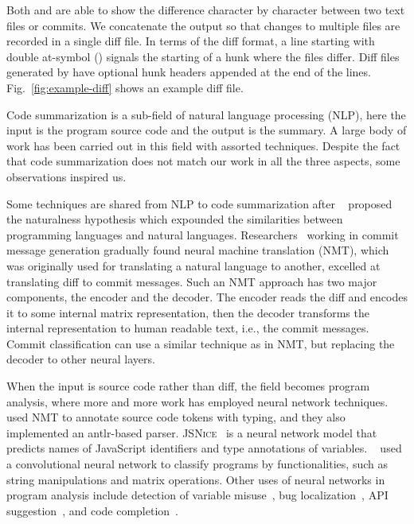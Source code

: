 Both {\gnudiff} and {\gitdiff} are able to show the difference character by character between two text files or commits.
We concatenate the output so that changes to multiple files are recorded in a single diff file.
In terms of the diff format, a line starting with double at-symbol () signals the starting of a hunk where the files differ.
Diff files generated by {\gitdiff} have optional hunk headers appended at the end of the  lines.
Fig.~\ref{fig:example-diff} shows an example diff file.

Code summarization is a sub-field of natural language processing (NLP),
here the input is the program source code and the output is the summary.
A large body of work has been carried out in this field with assorted techniques.
Despite the fact that code summarization does not match our work in all the three aspects,
some observations inspired us.

Some techniques are shared from NLP to code summarization after ~\cite{allamanis2018survey} proposed the naturalness hypothesis which expounded the similarities between programming languages and natural languages.
Researchers~\cite{xu2019commit,liu2019generating} working in commit message generation gradually found neural machine translation (NMT),
which was originally used for translating a natural language to another,
excelled at translating diff to commit messages.
Such an NMT approach has two major components, the encoder and the decoder.
The encoder reads the diff and encodes it to some internal matrix representation,
then the decoder transforms the internal representation to human readable text, i.e., the commit messages.
Commit classification can use a similar technique as in NMT,
but replacing the decoder to other neural layers.

When the input is source code rather than diff,
the field becomes program analysis, where more and more work has employed neural network techniques.
~\cite{alexandru2017replicating} used NMT to annotate source code tokens with typing,
and they also implemented an {\sc antlr}-based parser.
\textsc{JSNice}~\cite{raychev2015predicting} is a neural network model that predicts names of JavaScript identifiers and type annotations of variables.
~\cite{mou2016convolutional} used a convolutional neural network to classify programs by functionalities, such as string manipulations and matrix operations.
Other uses of neural networks in program analysis include
detection of variable misuse~\cite{morgachev2019detection},
bug localization~\cite{huo2016learning},
API suggestion~\cite{gu2016deep}, and
code completion~\cite{raychev2014code}.

